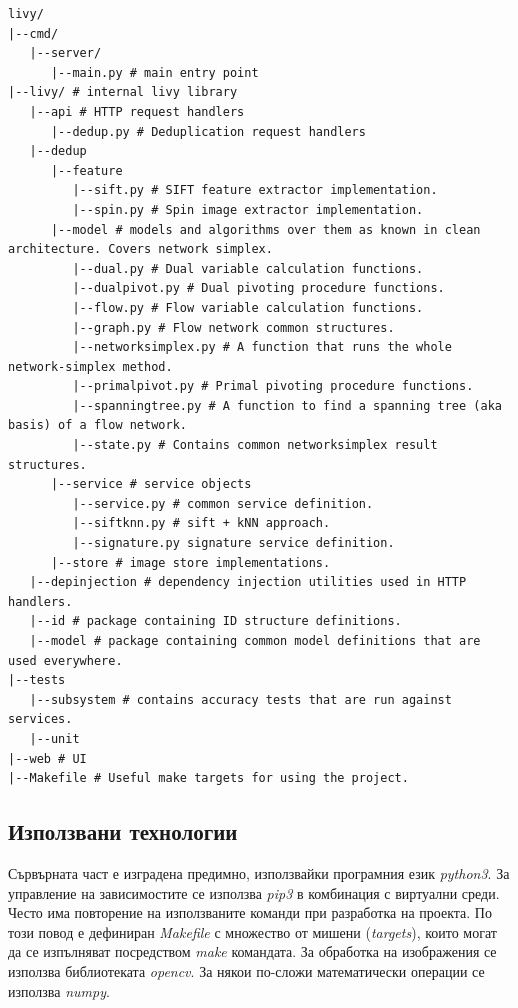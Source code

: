 \documentclass[a4paper,12pt]{article}
\begin{document}
\begin{lstlisting}[language={}, caption={Описание на директорийната структура на имплементацията}]
livy/
|--cmd/
   |--server/
      |--main.py # main entry point
|--livy/ # internal livy library
   |--api # HTTP request handlers
      |--dedup.py # Deduplication request handlers
   |--dedup
      |--feature
         |--sift.py # SIFT feature extractor implementation.
         |--spin.py # Spin image extractor implementation.
      |--model # models and algorithms over them as known in clean architecture. Covers network simplex.
         |--dual.py # Dual variable calculation functions.
         |--dualpivot.py # Dual pivoting procedure functions.
         |--flow.py # Flow variable calculation functions.
         |--graph.py # Flow network common structures.
         |--networksimplex.py # A function that runs the whole network-simplex method.
         |--primalpivot.py # Primal pivoting procedure functions.
         |--spanningtree.py # A function to find a spanning tree (aka basis) of a flow network.
         |--state.py # Contains common networksimplex result structures.
      |--service # service objects
         |--service.py # common service definition.
         |--siftknn.py # sift + kNN approach.
         |--signature.py signature service definition.
      |--store # image store implementations.
   |--depinjection # dependency injection utilities used in HTTP handlers.
   |--id # package containing ID structure definitions.
   |--model # package containing common model definitions that are used everywhere.
|--tests
   |--subsystem # contains accuracy tests that are run against services.
   |--unit
|--web # UI
|--Makefile # Useful make targets for using the project.
\end{lstlisting}

\subsection{Използвани технологии}

Сървърната част е изградена предимно, използвайки програмния език \textit{python3}. За управление на зависимостите се използва \textit{pip3} в комбинация с виртуални среди. Често има повторение на използваните команди при разработка на проекта. По този повод е дефиниран \textit{Makefile} с множество от мишени (\textit{targets}), които могат да се изпълняват посредством \textit{make} командата. За обработка на изображения се използва библиотеката \textit{opencv}. За някои по-сложи математически операции се използва \textit{numpy}.
\end{document}
